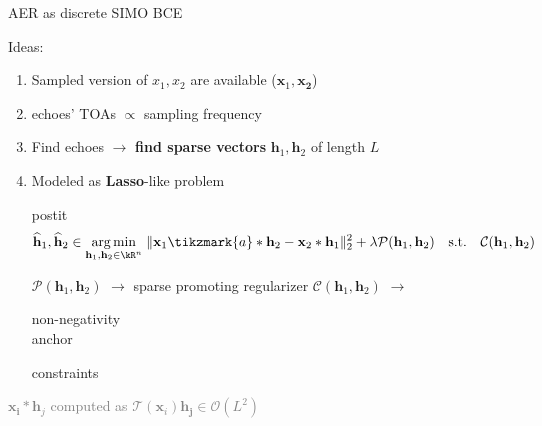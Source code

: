 \begin{frame}{AER as discrete SIMO BCE}
    \begin{block}{Ideas:}
    \begin{enumerate}
        \item Sampled version of $x_1,x_2$ are available ($\mathbf{x}_1, \mathbf{x_2}$)
        \item echoes' TOAs $\propto$ sampling frequency
        \item Find echoes $\rightarrow$ \textbf{find sparse vectors} $\mathbf{h}_1, \mathbf{h}_2$ of length $L$
        \item Modeled as \textbf{Lasso}-like problem

        \vspace*{.25em}

        \begin{beamercolorbox}[sep=.5em]{postit}
            \begin{equation*}
                \widehat{\mathbf{h}}_1, \widehat{\mathbf{h}}_2 \in
                \underset{\mathbf{h}_1, \mathbf{h}_2\in\kR^n}{\arg\min}\;
                \Vert \mathbf{x}_1 \tikzmark{a}\ast \mathbf{h}_2 - \mathbf{x}_2 \ast \mathbf{h}_1 \Vert_2^2
                + \lambda \mathcal{P}(\mathbf{h}_1, \mathbf{h}_2)
                \quad\text{s.t.}\quad\mathcal{C}(\mathbf{h}_1, \mathbf{h}_2)
            \end{equation*}

            \vspace*{0.3em}
            \begin{center}
                \footnotesize
                \hspace{5mm} $\mathcal{P}(\mathbf{h}_1, \mathbf{h}_2)$ $\longrightarrow$ sparse promoting regularizer
                \hfill \footnotesize $\mathcal{C}(\mathbf{h}_1, \mathbf{h}_2)$ $\longrightarrow$ \parbox{8em}{\centering non-negativity\\anchor}constraints
            \end{center}
        \end{beamercolorbox}

    \end{enumerate}

    \vspace{-3mm}
    \textcolor{gray}{\small $\mathbf{x_i} \ast \mathbf{h}_j$ computed as $\mathcal{T}(\mathbf{x}_i) \mathbf{h_j} \in \mathcal{O}(L^2)$}


\end{block}
\end{frame}
